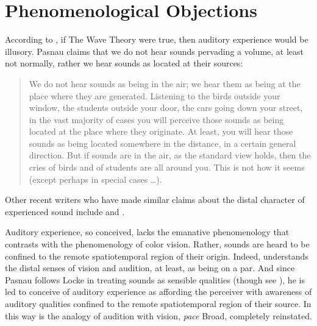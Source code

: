 
\section{Phenomenological Objections} %
\label{sec:phenomenological_objections}

According to \citet{Pasnau:1999ss}, if The Wave Theory were true, then auditory experience would be illusory. Pasnau claims that we do not hear sounds pervading a volume, at least not normally, rather we hear sounds as located at their sources:
\begin{quote}
	We do not hear sounds as being in the air; we hear them as being at the place where they are generated. Listening to the birds outside your window, the students outside your door, the cars going down your street, in the vast majority of cases you will perceive those sounds as being located at the place where they originate. At least, you will hear those sounds as being located somewhere in the distance, in a certain general direction. But if sounds are in the air, as the standard view holds, then the cries of birds and of students are all around you. This is not how it seems (except perhaps in special cases \ldots). \citep[311]{Pasnau:1999ss}
\end{quote}
Other recent writers who have made similar claims about the distal character of experienced sound include \citet{Casati:1994aa} and \citet{OCallaghan:2007xy}.

Auditory experience, so conceived, lacks the emanative phenomenology that \citet{Broad:1952kx} contrasts with the phenomenology of color vision. Rather, sounds are heard to be confined to the remote spatiotemporal region of their origin. Indeed,  \citet{Pasnau:1999ss} understands the distal senses of vision and audition, at least, as being on a par. And since Pasnau follows Locke in treating sounds as sensible qualities (though see \citealt{Pasnau:2009ys}), he is led to conceive of auditory experience as affording the perceiver with awareness of auditory qualities confined to the remote spatiotemporal region of their source. In this way is the analogy of audition with vision, \emph{pace} Broad, completely reinstated. 

